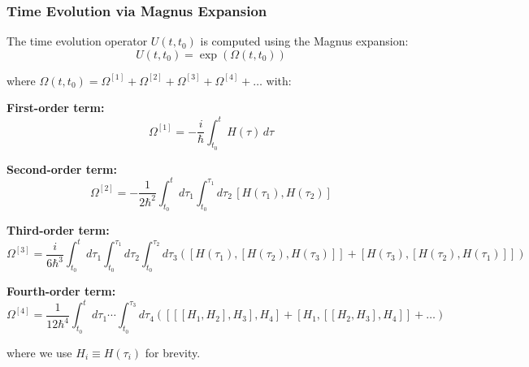 \documentclass[12pt,a4paper]{article}
\begin{document}
\subsubsection{Time Evolution via Magnus Expansion}

The time evolution operator $U(t, t_0)$ is computed using the Magnus expansion:
\begin{equation}
U(t, t_0) = \exp\left(\Omega(t, t_0)\right)
\label{eq:magnus-main}
\end{equation}

where $\Omega(t, t_0) = \Omega^{[1]} + \Omega^{[2]} + \Omega^{[3]} + \Omega^{[4]} + \ldots$ with:

\textbf{First-order term:}
\begin{equation}
\Omega^{[1]} = -\frac{i}{\hbar} \int_{t_0}^{t} H(\tau) \, d\tau
\label{eq:magnus1}
\end{equation}

\textbf{Second-order term:}
\begin{equation}
\Omega^{[2]} = -\frac{1}{2\hbar^2} \int_{t_0}^{t} d\tau_1 \int_{t_0}^{\tau_1} d\tau_2 \, [H(\tau_1), H(\tau_2)]
\label{eq:magnus2}
\end{equation}

\textbf{Third-order term:}
\begin{equation}
\Omega^{[3]} = \frac{i}{6\hbar^3} \int_{t_0}^{t} d\tau_1 \int_{t_0}^{\tau_1} d\tau_2 \int_{t_0}^{\tau_2} d\tau_3 \left([H(\tau_1), [H(\tau_2), H(\tau_3)]] + [H(\tau_3), [H(\tau_2), H(\tau_1)]]\right)
\label{eq:magnus3}
\end{equation}

\textbf{Fourth-order term:}
\begin{equation}
\Omega^{[4]} = \frac{1}{12\hbar^4} \int_{t_0}^{t} d\tau_1 \cdots \int_{t_0}^{\tau_3} d\tau_4 \left([[[H_1, H_2], H_3], H_4] + [H_1, [[H_2, H_3], H_4]] + \ldots\right)
\label{eq:magnus4}
\end{equation}

where we use $H_i \equiv H(\tau_i)$ for brevity.
\end{document}
